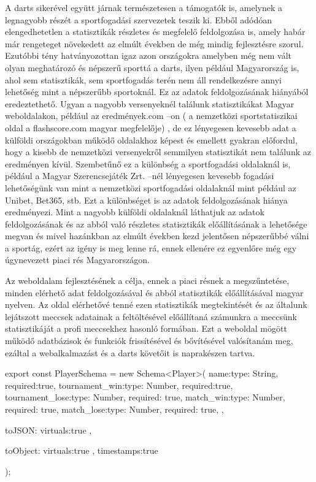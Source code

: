 A darts sikerével együtt járnak természetesen a támogatók is, amelynek a legnagyobb részét 
a sportfogadási szervezetek teszik ki. Ebből adódóan elengedhetetlen a statisztikák részletes 
és megfelelő feldolgozása is, amely habár már rengeteget növekedett az elmúlt években de 
még mindig fejlesztésre szorul. Ezutóbbi tény hatványozottan igaz azon országokra 
amelyben még nem vált olyan meghatározó és népszerű sporttá a darts, ilyen például 
Magyarország is, ahol sem statisztikák, sem sportfogadás terén nem áll rendelkezésre annyi 
lehetőség mint a népszerűbb sportoknál. Ez az adatok feldolgozásának hiányából 
eredeztethető. Ugyan a nagyobb versenyeknél találunk statisztikákat Magyar weboldalakon, 
például az eredmények.com –on ( a nemzetközi sportstatiszikai oldal a flashscore.com 
magyar megfelelője) , de ez lényegesen kevesebb adat a külföldi országokban működő 
oldalakhoz képest és emellett gyakran előfordul, hogy a kisebb de nemzetközi versenyekről 
semmilyen statisztikát nem találunk az eredményen kívül. Szembetűnő ez a különbség a 
sportfogadási oldalaknál is, például a Magyar Szerencsejáték Zrt. –nél lényegesen kevesebb 
fogadási lehetőségünk van mint a nemzetközi sportfogadási oldalaknál mint például az 
Unibet, Bet365, stb. Ezt a különbséget is az adatok feldolgozásának hiánya eredményezi. 
Mint a nagyobb külföldi oldalaknál láthatjuk az adatok feldolgozásának és az abból való 
részletes statisztikák előállításának a lehetősége megvan és mivel hazánkban az elmúlt 
években kezd jelentősen népszerűbbé válni a sportág, ezért az igény is meg lenne rá, ennek 
ellenére  ez egyenlőre még egy úgynevezett piaci rés Magyarországon.

Az weboldalam fejlesztésének a célja, ennek a piaci résnek a megszűntetése, minden 
elérhető adat feldolgozásával és abból statisztikák előállításával magyar nyelven. Az oldal 
elérhetővé tenné ezen statisztikák megtekintését és az általunk lejátszott meccsek adatainak 
a feltöltésével előállítaná számunkra a meccsünk statisztikáját a profi meccsekhez hasonló 
formában. Ezt a weboldal mögött működő adatbázisok és funkciók frissítésével és 
bővítésével valósítanám meg, ezáltal a webalkalmazást és a darts követőit is naprakészen 
tartva.


\begin{cpp}
export const PlayerSchema = new Schema<Player>(
    {
        name:{type: String, required:true},
        tournament_win:{type: Number, required:true},
        tournament_lose:{type: Number, required: true},
        match_win:{type: Number, required: true},
        match_lose:{type: Number, required: true},
    },{
        toJSON:{
            virtuals:true
        },

        toObject:{
            virtuals:true
        },
        timestamps:true
    }
);
\end{cpp}